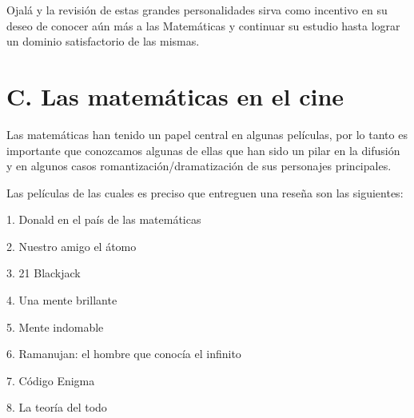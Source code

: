 \documentclass[]{book}
\begin{document}
Ojalá y la revisión de estas grandes personalidades sirva como incentivo
en su deseo de conocer aún más a las Matemáticas y continuar su estudio
hasta lograr un dominio satisfactorio de las mismas.

\section{C. Las matemáticas en el
cine}\label{c.-las-matemuxe1ticas-en-el-cine}

Las matemáticas han tenido un papel central en algunas películas, por lo
tanto es importante que conozcamos algunas de ellas que han sido un
pilar en la difusión y en algunos casos romantización/dramatización de
sus personajes principales.

Las películas de las cuales es preciso que entreguen una reseña son las
siguientes:

\begin{multicols}{2}

      1. Donald en el país de las matemáticas
  
      2. Nuestro amigo el átomo
  
      3. 21 Blackjack
  
      4. Una mente brillante
  
      5. Mente indomable
  
      6. Ramanujan: el hombre que conocía el infinito
  
      7. Código Enigma
  
      8. La teoría del todo
\end{multicols}
\end{document}
